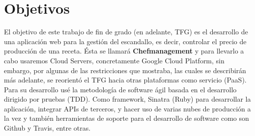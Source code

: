 

%

\section{Objetivos}
\label{cap.1.1}
El objetivo de este trabajo de fin de grado (en adelante, TFG) es el desarrollo de una aplicación web para la gestión del escandallo, es decir, controlar el precio de producción de una receta. Ésta se llamará \textbf{Chefmanagement} y para llevarlo a cabo usaremos Cloud Servers, concretamente Google Cloud Platform, sin embargo, por algunas de las restricciones que mostraba, las cuales se describirán más adelante, se reorientó el TFG hacia otras plataformas como servicio (PaaS). Para su desarrollo usé la metodología de software ágil basada en el desarrollo dirigido por pruebas (TDD). Como framework, Sinatra (Ruby) para desarrollar la aplicación, integrar APIs de terceros, y hacer uso de varias nubes de producción a la vez y también herramientas de soporte para el desarrollo de software como son Github y Travis, entre otras.

\vspace*{0.2in}
